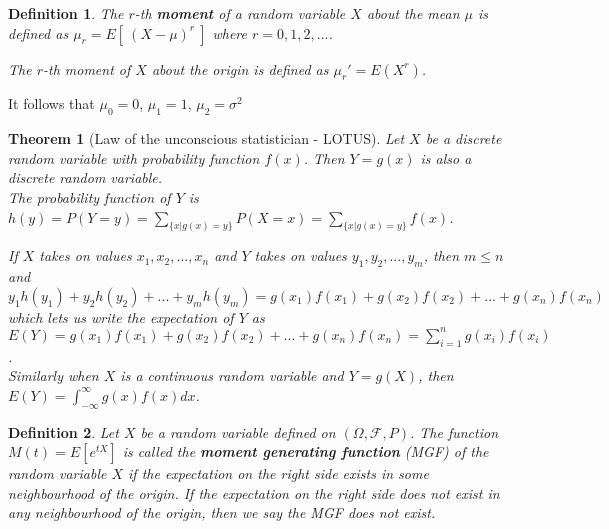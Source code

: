 \documentclass[14pt,twoside]{extreport}
\theoremstyle{dotless}
\newtheorem*{defn}{Definition}
\newtheorem*{thm}{Theorem} %
\begin{document}
\begin{defn}
    The $r$-th \textbf{moment} of a random variable $X$ about the mean $\mu$ is defined as $\mu_r = E[\  (X - \mu)^r \ ]$ where $r=0, 1, 2, ...$.

    The $r$-th moment of $X$ about the origin is defined as $\mu_r ' = E(X^r)$.
\end{defn}

It follows that $\mu_0 = 0$, $\mu_1 = 1$, $\mu_2 = \sigma ^2$

\begin{samepage}
\begin{thm}[Law of the unconscious statistician - LOTUS]
    Let $X$ be a discrete random variable with probability function $f(x)$. Then $Y = g(x)$ is also a discrete random variable. \\ The probability function of $Y$ is $h(y) = P(Y = y) = \sum_{ \{x | g(x) = y \} } P(X = x) = \sum_{ \{x | g(x) = y \} } f(x)$.

    If $X$ takes on values $x_1, x_2, ..., x_n$  and $Y$ takes on values $y_1, y_2, ..., y_m$, then $m \leq n$ and $y_1 h(y_1) + y_2 h(y_2) + ... + y_m h(y_m) = g(x_1) f(x_1) + g(x_2) f(x_2) + ... + g(x_n) f(x_n)$ which lets us write the expectation of $Y$ as \\ $E(Y) = g(x_1)f(x_1) + g(x_2)f(x_2) + ... + g(x_n)f(x_n) = \sum_{i=1}^n g(x_i)f(x_i)$.
    \\ 

    Similarly when $X$ is a continuous random variable and $Y=g(X)$, then $E(Y) = \int_{- \infty}^{\infty} g(x) f(x) dx$.
\end{thm}
\end{samepage}

\begin{defn}
    Let $X$ be a random variable defined on $\left (\Omega,  \mathcal{F}, P\right )$. The function $M\left (t\right ) = E\left [e ^{t X}\right ]$ is called the \textbf{moment generating function} (MGF) of the random variable $X$ if the expectation on the right side exists in some neighbourhood of the origin. If the expectation on the right side does not exist in any neighbourhood of the origin, then we say the MGF does not exist.
\end{defn}
\end{document}
